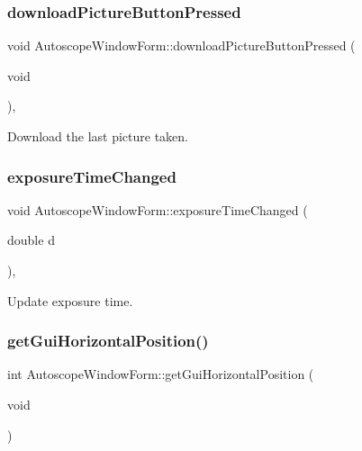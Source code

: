 \subsubsection{\texorpdfstring{downloadPictureButtonPressed}{downloadPictureButtonPressed}}
{\footnotesize\ttfamily void Autoscope\+Window\+Form\+::download\+Picture\+Button\+Pressed (\begin{DoxyParamCaption}\item[{void}]{ }\end{DoxyParamCaption})\hspace{0.3cm}{\ttfamily [private]}, {\ttfamily [slot]}}



Download the last picture taken. 

\mbox{\label{class_autoscope_window_form_a2a96899ef93c00205b604c9f4d6ad8e0}} 
\subsubsection{\texorpdfstring{exposureTimeChanged}{exposureTimeChanged}}
{\footnotesize\ttfamily void Autoscope\+Window\+Form\+::exposure\+Time\+Changed (\begin{DoxyParamCaption}\item[{double}]{d }\end{DoxyParamCaption})\hspace{0.3cm}{\ttfamily [private]}, {\ttfamily [slot]}}



Update exposure time. 

\mbox{\label{class_autoscope_window_form_ad065e4a2a518d779407238e3c258f6e6}} 
\subsubsection{\texorpdfstring{getGuiHorizontalPosition()}{getGuiHorizontalPosition()}}
{\footnotesize\ttfamily int Autoscope\+Window\+Form\+::get\+Gui\+Horizontal\+Position (\begin{DoxyParamCaption}\item[{void}]{ }\end{DoxyParamCaption})}



